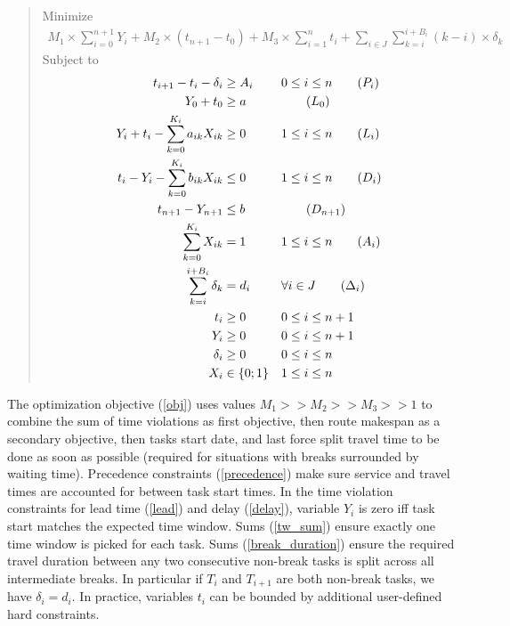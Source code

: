 \documentclass{article}
\begin{document}
\begin{quote}
  Minimize
  \begin{align}
    M_1 \times \sum_{i = 0}^{n + 1} Y_i + M_2 \times (t_{n +1} - t_0) + M_3\times\sum_{i = 1}^{n}t_i + \sum_{i\in J}\sum_{k = i}^{i + B_i}(k - i)\times\delta_k\label{obj}\tag{Obj}
  \end{align}
  Subject to
  \begin{align}
    t_{i + 1} - t_i - \delta_i &\geq A_i && 0 \leq i \leq n\label{precedence}\tag{$P_i$}\\
    Y_0 + t_0 &\geq a &&  \label{lead_start}\tag{$L_0$}\\
    Y_i + t_i - \sum_{k = 0}^{K_i}a_{ik}X_{ik}&\geq 0 && 1 \leq i \leq n \label{lead}\tag{$L_i$}\\
    t_i - Y_i - \sum_{k = 0}^{K_i}b_{ik}X_{ik} &\leq 0 && 1 \leq i \leq n \label{delay}\tag{$D_i$}\\
    t_{n + 1} - Y_{n + 1} &\leq b && \label{delay_end}\tag{$D_{n + 1}$}\\
    \sum_{k = 0}^{K_i}X_{ik} &= 1 && 1 \leq i \leq n \label{tw_sum}\tag{$A_i$}\\
    \sum_{k = i}^{i + B_i}\delta_k &= d_i && \forall i\in J \label{break_duration}\tag{$\Delta_i$}\\
    t_i &\geq 0 && 0 \leq i \leq n + 1 \nonumber\\
    Y_i &\geq 0 && 0 \leq i \leq n + 1 \nonumber\\
    \delta_i &\geq 0 && 0 \leq i \leq n \nonumber\\
    X_i &\in \{0; 1\} && 1 \leq i \leq n \nonumber
  \end{align}
\end{quote}

The optimization objective (\ref{obj}) uses values
$M_1 >> M_2 >> M_3 >> 1$ to combine the sum of time violations as
first objective, then route makespan as a secondary objective, then
tasks start date, and last force split travel time to be done as soon
as possible (required for situations with breaks surrounded by waiting
time). Precedence constraints (\ref{precedence}) make sure service and
travel times are accounted for between task start times. In the time
violation constraints for lead time (\ref{lead}) and delay
(\ref{delay}), variable $Y_i$ is zero iff task start matches the
expected time window. Sums (\ref{tw_sum}) ensure exactly one time
window is picked for each task. Sums (\ref{break_duration}) ensure the
required travel duration between any two consecutive non-break tasks
is split across all intermediate breaks. In particular if $T_i$ and
$T_{i + 1}$ are both non-break tasks, we have $\delta_i = d_i$. In
practice, variables $t_i$ can be bounded by additional user-defined
hard constraints.
\end{document}
